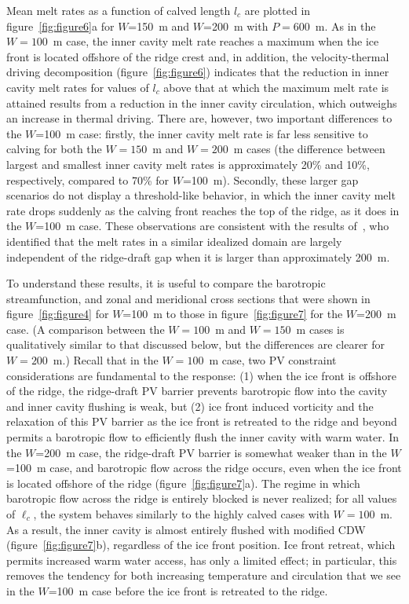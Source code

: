 \documentclass[draft]{agujournal2019}
\begin{document}
Mean melt rates as a function of calved length $l_c$ are plotted in figure~\ref{fig:figure6}a for $W$=150~m and $W$=200~m with $P = 600$~m. As in the $W=100$~m case, the inner cavity melt rate reaches a maximum when the ice front is located offshore of the ridge crest and, in addition, the velocity-thermal driving decomposition (figure~\ref{fig:figure6}) indicates that the reduction in inner cavity melt rates for values of $l_c$ above that at which the maximum melt rate is attained results from a reduction in the inner cavity circulation, which outweighs an increase in thermal driving. There are, however, two important differences to the $W$=100~m case: firstly, the inner cavity melt rate is far less sensitive to calving for both the $W=150$~m and $W=200$~m cases (the difference between largest and smallest inner cavity melt rates is approximately 20\% and 10\%, respectively, compared to 70\% for $W$=100~m). Secondly, these larger gap scenarios do not display a threshold-like behavior, in which the inner cavity melt rate drops suddenly as the calving front reaches the top of the ridge, as it does in the $W$=100~m case. These observations are consistent with the results of~, who identified that the melt rates in a similar idealized domain are largely independent of the ridge-draft gap when it is larger than approximately 200~m.

To understand these results, it is useful to compare the barotropic streamfunction, and zonal and meridional cross sections that were shown in figure~\ref{fig:figure4} for $W$=100~m to those in figure~\ref{fig:figure7} for the $W$=200~m case. (A comparison between the $W=100$~m and $W=150$~m cases is qualitatively similar to that discussed below, but the differences are clearer for $W=200$~m.) Recall that in the $W=100$~m case, two PV constraint considerations are fundamental to the response: (1) when the ice front is offshore of the ridge, the ridge-draft PV barrier prevents barotropic flow into the cavity and inner cavity flushing is weak, but (2) ice front induced vorticity and the relaxation of this PV barrier as the ice front is retreated to the ridge and beyond permits a barotropic flow to efficiently flush the inner cavity with warm water. In the $W$=200~m case, the ridge-draft PV barrier is somewhat weaker than in the $W$=100~m case, and barotropic flow across the ridge occurs, even when the ice front is located offshore of the ridge (figure~\ref{fig:figure7}a). The regime in which barotropic flow across the ridge is entirely blocked is never realized; for all values of $\ell_c$, the system behaves similarly to the highly calved cases with $W = 100$~m. As a result, the inner cavity is almost entirely flushed with modified CDW (figure~\ref{fig:figure7}b), regardless of the ice front position. Ice front retreat, which permits increased warm water access, has only a limited effect; in particular, this removes the tendency for both increasing temperature and circulation that we see in the $W$=100~m case before the ice front is retreated to the ridge.
\end{document}
